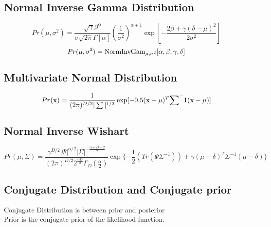 \documentclass[12pt,a4paper]{article}
\begin{document}
\subsection*{Normal Inverse Gamma Distribution}
$$
Pr(\mu,\sigma^2) = \frac{\sqrt{\gamma}\beta^{\alpha}}{\sigma\sqrt{2\pi}\Gamma[\alpha]}(\frac{1}{\sigma^2})^{\alpha+1}\exp[-\frac{2\beta+\gamma(\delta-\mu)^2}{2\sigma^2}]
$$
$$
Pr(\mu,\sigma^2) = {\rm NormInvGam}_{\mu,\sigma^2}[\alpha,\beta,\gamma,\delta]
$$
\subsection*{Multivariate Normal Distribution}
$$
Pr({\bf x})=\frac{1}{(2\pi)^{D/2}|\sum|^{1/2}}\exp[-0.5({\bf x- \mu})^T{\sum}^-1(\bf x-\mu)]
$$
\subsection*{Normal Inverse Wishart}
$$
Pr(\mu,\Sigma) = \frac{\gamma^{D/2}|\Psi|^{\alpha/2}|\Sigma|^{-\frac{\alpha+D+2}{2}}}{(2\pi)^{D/2}2^{\frac{\alpha D}{2}}\Gamma_D(\frac{\alpha}{2})}\exp\{-\frac{1}{2}(Tr(\Psi\Sigma^{-1}))+\gamma(\mu-\delta)^T\Sigma^{-1}(\mu-\delta)\}
$$
\subsection*{Conjugate Distribution and Conjugate prior}
Conjugate Distribution is between prior and posterior\\
Prior is the conjugate prior of the likelihood function.
\end{document}
